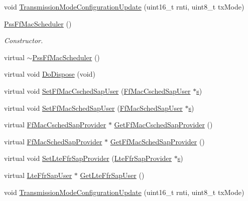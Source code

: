 \begin{DoxyCompactItemize}
\item 
void \hyperlink{classns3_1_1PssFfMacScheduler_a8da9dee3a2925075c6c72104fd13f35a}{Transmission\+Mode\+Configuration\+Update} (uint16\+\_\+t rnti, uint8\+\_\+t tx\+Mode)
\item 
\hyperlink{classns3_1_1PssFfMacScheduler_ac74abd1f46b26a6ba4050f19d9fb45ff}{Pss\+Ff\+Mac\+Scheduler} ()
\begin{DoxyCompactList}\small\item\em Constructor. \end{DoxyCompactList}\item 
virtual \hyperlink{classns3_1_1PssFfMacScheduler_a0245134d9f9783cd60af9f1e2e5f6bb2}{$\sim$\+Pss\+Ff\+Mac\+Scheduler} ()
\item 
virtual void \hyperlink{classns3_1_1PssFfMacScheduler_a4bbf1f8fb80d53ea04321c690092deee}{Do\+Dispose} (void)
\item 
virtual void \hyperlink{classns3_1_1PssFfMacScheduler_ac9f49b4aa8dbe64bcbfc7437886c6db1}{Set\+Ff\+Mac\+Csched\+Sap\+User} (\hyperlink{classns3_1_1FfMacCschedSapUser}{Ff\+Mac\+Csched\+Sap\+User} $\ast$\hyperlink{generate__test__data__lte__sinr_8m_ad83eeb3a142285d1243a08c6b7026df8}{s})
\item 
virtual void \hyperlink{classns3_1_1PssFfMacScheduler_ad49c23bfd99840e43c1183653f3dfa19}{Set\+Ff\+Mac\+Sched\+Sap\+User} (\hyperlink{classns3_1_1FfMacSchedSapUser}{Ff\+Mac\+Sched\+Sap\+User} $\ast$\hyperlink{generate__test__data__lte__sinr_8m_ad83eeb3a142285d1243a08c6b7026df8}{s})
\item 
virtual \hyperlink{classns3_1_1FfMacCschedSapProvider}{Ff\+Mac\+Csched\+Sap\+Provider} $\ast$ \hyperlink{classns3_1_1PssFfMacScheduler_adf0328a808e9d89f42e9aa51d5a36b7e}{Get\+Ff\+Mac\+Csched\+Sap\+Provider} ()
\item 
virtual \hyperlink{classns3_1_1FfMacSchedSapProvider}{Ff\+Mac\+Sched\+Sap\+Provider} $\ast$ \hyperlink{classns3_1_1PssFfMacScheduler_a135e9a37de3ee0e009f8e18f7bf3dfd6}{Get\+Ff\+Mac\+Sched\+Sap\+Provider} ()
\item 
virtual void \hyperlink{classns3_1_1PssFfMacScheduler_ab11028fccdb730ceb53f2239c4871ed5}{Set\+Lte\+Ffr\+Sap\+Provider} (\hyperlink{classns3_1_1LteFfrSapProvider}{Lte\+Ffr\+Sap\+Provider} $\ast$\hyperlink{generate__test__data__lte__sinr_8m_ad83eeb3a142285d1243a08c6b7026df8}{s})
\item 
virtual \hyperlink{classns3_1_1LteFfrSapUser}{Lte\+Ffr\+Sap\+User} $\ast$ \hyperlink{classns3_1_1PssFfMacScheduler_a988802206e5d09c70986f9d492ec93ca}{Get\+Lte\+Ffr\+Sap\+User} ()
\item 
void \hyperlink{classns3_1_1PssFfMacScheduler_a8da9dee3a2925075c6c72104fd13f35a}{Transmission\+Mode\+Configuration\+Update} (uint16\+\_\+t rnti, uint8\+\_\+t tx\+Mode)
\end{DoxyCompactItemize}
